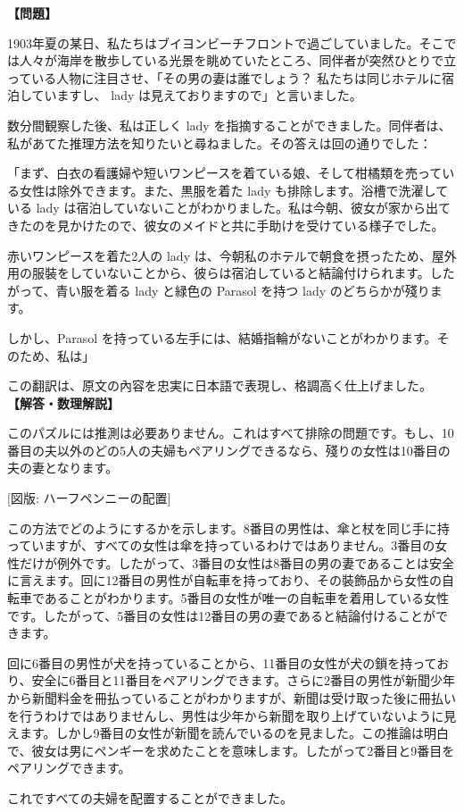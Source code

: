 \documentclass[10pt,a4paper,oneside,openany]{ltjsbook}
\begin{document}
\begin{tcolorbox}[colback=softblue,colframe=primaryblue,title=\textbf{第 430 問：夫を見つけろ。 （原題: FIND THE MAN'S WIFE.）},arc=2mm,boxrule=1pt,breakable]
\textbf{【問題】}\par\vspace{0.3em}
1903年夏の某日、私たちはブイヨンビーチフロントで過ごしていました。そこでは人々が海岸を散歩している光景を眺めていたところ、同伴者が突然ひとりで立っている人物に注目させ、「その男の妻は誰でしょう？ 私たちは同じホテルに宿泊していますし、 lady は見えておりますので」と言いました。

数分間観察した後、私は正しく lady を指摘することができました。同伴者は、私があてた推理方法を知りたいと尋ねました。その答えは回の通りでした：

「まず、白衣の看護婦や短いワンピースを着ている娘、そして柑橘類を売っている女性は除外できます。また、黒服を着た lady も排除します。浴槽で洗濯している lady は宿泊していないことがわかりました。私は今朝、彼女が家から出てきたのを見かけたので、彼女のメイドと共に手助けを受けている様子でした。

赤いワンピースを着た2人の lady は、今朝私のホテルで朝食を摂ったため、屋外用の服裝をしていないことから、彼らは宿泊していると結論付けられます。したがって、青い服を着る lady と緑色の Parasol を持つ lady のどちらかが殘ります。

しかし、Parasol を持っている左手には、結婚指輪がないことがわかります。そのため、私は」

この翻訳は、原文の內容を忠実に日本語で表現し、格調高く仕上げました。
\tcblower
\textbf{【解答・数理解説】}\par\vspace{0.3em}
このパズルには推測は必要ありません。これはすべて排除の問題です。もし、10番目の夫以外のどの5人の夫婦もペアリングできるなら、殘りの女性は10番目の夫の妻となります。

[図版: ハーフペンニーの配置]

この方法でどのようにするかを示します。8番目の男性は、傘と杖を同じ手に持っていますが、すべての女性は傘を持っているわけではありません。3番目の女性だけが例外です。したがって、3番目の女性は8番目の男の妻であることは安全に言えます。回に12番目の男性が自転車を持っており、その裝飾品から女性の自転車であることがわかります。5番目の女性が唯一の自転車を着用している女性です。したがって、5番目の女性は12番目の男の妻であると結論付けることができます。

回に6番目の男性が犬を持っていることから、11番目の女性が犬の鎖を持っており、安全に6番目と11番目をペアリングできます。さらに2番目の男性が新聞少年から新聞料金を冊払っていることがわかりますが、新聞は受け取った後に冊払いを行うわけではありませんし、男性は少年から新聞を取り上げていないように見えます。しかし9番目の女性が新聞を読んでいるのを見ました。この推論は明白で、彼女は男にペンギーを求めたことを意味します。したがって2番目と9番目をペアリングできます。

これですべての夫婦を配置することができました。
\end{tcolorbox}
\end{document}
